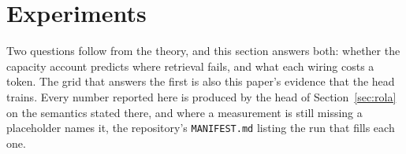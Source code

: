 %
%
%
\section{Experiments}
\label{sec:experiments}

Two questions follow from the theory, and this section answers both: whether the capacity account predicts where retrieval fails, and what each wiring costs a token. The grid that answers the first is also this paper's evidence that the head trains. Every number reported here is produced by the head of Section~\ref{sec:rola} on the semantics stated there, and where a measurement is still missing a placeholder names it, the repository's \texttt{MANIFEST.md} listing the run that fills each one.

